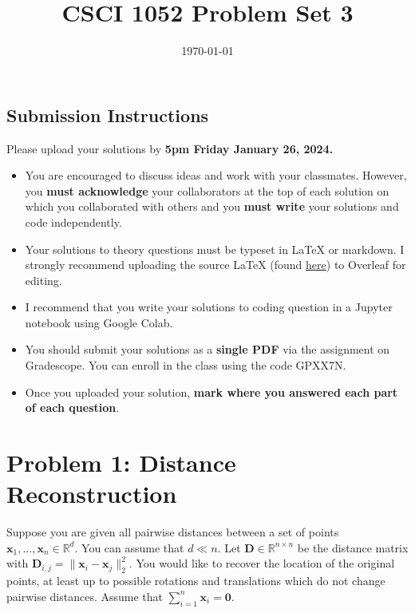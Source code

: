 \documentclass{article}
\title{CSCI 1052 Problem Set 3}
\author{} %
\date{\today}
\begin{document}
\maketitle

\subsection*{Submission Instructions}

Please upload your solutions by
\textbf{5pm Friday January 26, 2024.}
\begin{itemize}
\item You are encouraged to discuss ideas
and work with your classmates. However, you
\textbf{must acknowledge} your collaborators
at the top of each solution on which
you collaborated with others 
and you \textbf{must write} your solutions and code
independently.
\item Your solutions to theory questions must
be typeset in LaTeX or markdown.
I strongly recommend uploading the source LaTeX (found 
\href{https://www.rtealwitter.com/rads2024/psets/pset3.tex}{here})
to Overleaf for editing.
\item I recommend that you write your solutions to coding question in a Jupyter notebook using Google Colab.
\item You should submit your solutions as a \textbf{single PDF} via the assignment on Gradescope. You can enroll in the class using the code GPXX7N.
\item Once you uploaded your solution, \textbf{mark where you answered each part of each question}.
\end{itemize}

\newpage

\section*{Problem 1: Distance Reconstruction}

Suppose you are given all pairwise distances between a set of points $\mathbf{x}_1, \ldots, \mathbf{x}_n \in \mathbb{R}^d$.
You can assume that $d \ll n$.
Let $\mathbf{D} \in \mathbb{R}^{n \times n}$ be the distance matrix with $\mathbf{D}_{i,j} = \| \mathbf{x}_i - \mathbf{x}_j \|_2^2$.
You would like to recover the location of the original points, at least up to possible rotations and translations which do not change pairwise distances.
Assume that $\sum_{i=1}^n \mathbf{x}_i = \mathbf{0}$.
\end{document}
